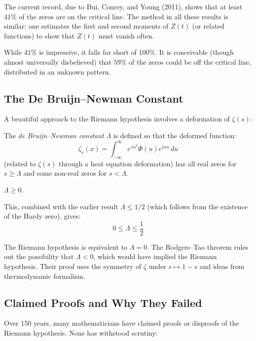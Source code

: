 The current record, due to Bui, Conrey, and Young (2011), shows that at least $41\%$ of the zeros are on the critical line. The method in all these results is similar: one estimates the first and second moments of $Z(t)$ (or related functions) to show that $Z(t)$ must vanish often.

While $41\%$ is impressive, it falls far short of $100\%$. It is conceivable (though almost universally disbelieved) that $59\%$ of the zeros could be off the critical line, distributed in an unknown pattern.

\subsection{The De Bruijn--Newman Constant}

A beautiful approach to the Riemann hypothesis involves a deformation of $\zeta(s)$:

\begin{definition}
The \textit{de Bruijn--Newman constant} $\Lambda$ is defined so that the deformed function:
\[
\zeta_s(x) = \int_{-\infty}^{\infty} e^{su^2} \Phi(u) e^{ixu} \, du
\]
(related to $\zeta(s)$ through a heat equation deformation) has all real zeros for $s \ge \Lambda$ and some non-real zeros for $s < \Lambda$.
\end{definition}

\begin{theorem}
$\Lambda \ge 0$.
\end{theorem}

This, combined with the earlier result $\Lambda \le 1/2$ (which follows from the existence of the Hardy zero), gives:
\[
0 \le \Lambda \le \frac{1}{2}
\]

The Riemann hypothesis is equivalent to $\Lambda = 0$. The Rodgers--Tao theorem rules out the possibility that $\Lambda < 0$, which would have implied the Riemann hypothesis. Their proof uses the symmetry of $\zeta$ under $s \mapsto 1 - s$ and ideas from thermodynamic formalism.

\subsection{Claimed Proofs and Why They Failed}

Over 150 years, many mathematicians have claimed proofs or disproofs of the Riemann hypothesis. None has withstood scrutiny:

